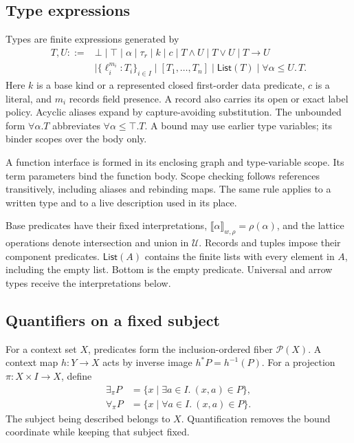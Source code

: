 \documentclass[10pt,a4paper]{article}
\newcommand{\sem}[1]{\llbracket #1\rrbracket}
\newcommand{\Pow}{\mathcal P}
\newcommand{\U}{\mathcal U}
\newcommand{\List}{\mathsf{List}}
\theoremstyle{remark}
\begin{document}
\subsection{Type expressions}
Types are finite expressions generated by
\begin{equation}\label{eq:grammar}
\begin{split}
 T,U ::= {}&\bot\mid\top\mid\alpha\mid\tau_r\mid k\mid c
          \mid T\land U\mid T\lor U\mid T\to U\\
          &\mid\{\ell_i^{m_i}:T_i\}_{i\in I}
          \mid[T_1,\ldots,T_n]\mid\List(T)
          \mid\forall\alpha\le U.\,T .
\end{split}
\end{equation}
Here $k$ is a base kind or a represented closed first-order data predicate,
$c$ is a literal, and $m_i$ records field presence. A record also carries its
open or exact label policy. Acyclic aliases expand by capture-avoiding
substitution. The unbounded form $\forall\alpha.T$ abbreviates
$\forall\alpha\le\top.T$. A bound may use earlier type variables; its binder
scopes over the body only.

A function interface is formed in its enclosing graph and type-variable scope.
Its term parameters bind the function body. Scope checking follows references
transitively, including aliases and rebinding maps. The same rule applies to a
written type and to a live description used in its place.

Base predicates have their fixed interpretations, $\sem\alpha_{w,\rho}=
\rho(\alpha)$, and the lattice operations denote intersection and union in
$\U$. Records and tuples impose their component predicates.
$\List(A)$ contains the finite lists with every element in $A$, including the
empty list. Bottom is the empty predicate. Universal and arrow types receive
the interpretations below.

\subsection{Quantifiers on a fixed subject}
For a context set $X$, predicates form the inclusion-ordered fiber $\Pow(X)$.
A context map $h:Y\to X$ acts by inverse image $h^*P=h^{-1}(P)$.
For a projection $\pi:X\times I\to X$, define
\begin{align}
 \exists_\pi P&=\{x\mid\exists a\in I.\ (x,a)\in P\},
       \label{eq:exists}\\
 \forall_\pi P&=\{x\mid\forall a\in I.\ (x,a)\in P\}.
       \label{eq:forall}
\end{align}
The subject being described belongs to $X$. Quantification removes the bound
coordinate while keeping that subject fixed.
\end{document}
